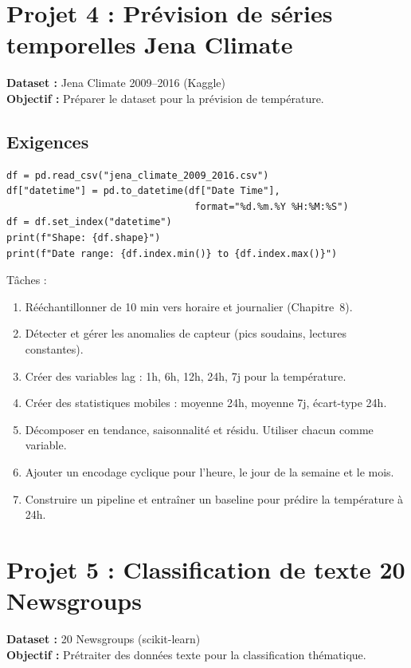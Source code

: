 \section{Projet 4 : Pr\'evision de s\'eries temporelles Jena Climate}

\textbf{Dataset :} Jena Climate 2009--2016 (Kaggle)\\
\textbf{Objectif :} Pr\'eparer le dataset pour la pr\'evision de temp\'erature.

\subsection{Exigences}

\begin{verbatim}
df = pd.read_csv("jena_climate_2009_2016.csv")
df["datetime"] = pd.to_datetime(df["Date Time"],
                                 format="%d.%m.%Y %H:%M:%S")
df = df.set_index("datetime")
print(f"Shape: {df.shape}")
print(f"Date range: {df.index.min()} to {df.index.max()}")
\end{verbatim}

T\^aches :
\begin{enumerate}
  \item R\'e\'echantillonner de 10 min vers horaire et journalier (Chapitre~8).
  \item D\'etecter et g\'erer les anomalies de capteur (pics soudains, lectures constantes).
  \item Cr\'eer des variables lag : 1h, 6h, 12h, 24h, 7j pour la temp\'erature.
  \item Cr\'eer des statistiques mobiles : moyenne 24h, moyenne 7j, \'ecart-type 24h.
  \item D\'ecomposer en tendance, saisonnalit\'e et r\'esidu. Utiliser chacun comme variable.
  \item Ajouter un encodage cyclique pour l'heure, le jour de la semaine et le mois.
  \item Construire un pipeline et entra\^iner un baseline pour pr\'edire la temp\'erature \`a 24h.
\end{enumerate}

\section{Projet 5 : Classification de texte 20 Newsgroups}

\textbf{Dataset :} 20 Newsgroups (scikit-learn)\\
\textbf{Objectif :} Pr\'etraiter des donn\'ees texte pour la classification th\'ematique.

